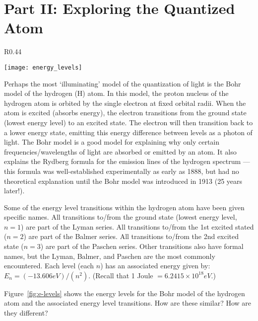 \section*{Part II: Exploring the Quantized Atom}
%
\begin{wrapfigure}{R}{0.44\textwidth}
  \vspace{-15pt}  
  \begin{center}
    \texttt{[image: energy\_levels]}
  \end{center}
  \vspace{-20pt}
  \caption{Energy level transitions for the Bohr Model of the hydrogen atom.}
  \label{fig:e-levels}
  \vspace{-10pt}
\end{wrapfigure}
%
Perhaps the most `illuminating' model of the quantization of light is the Bohr model of the hydrogen (H) atom. 
In this model, the proton nucleus of the hydrogen atom is orbited by the single electron at fixed orbital radii. 
When the atom is excited (absorbs energy), the electron transitions from the ground state (lowest energy level) to an excited state. 
The electron will then transition back to a lower energy state, emitting this energy difference between levels as a photon of light. 
The Bohr model is a good model for explaining why only certain frequencies/wavelengths of light are absorbed or emitted by an atom. 
It also explains the Rydberg formula for the emission lines of the hydrogen spectrum — this formula was well-established experimentally as early as 1888, but had no theoretical explanation until the Bohr model was introduced in 1913 (25 years later!). 
\par 
Some of the energy level transitions within the hydrogen atom have been given specific names. 
All transitions to/from the ground state (lowest energy level, $n = 1$) are part of the Lyman series. 
All transitions to/from the 1st excited stated ($n = 2$) are part of the Balmer series. 
All transitions to/from the 2nd excited state ($n = 3$) are part of the Paschen series. 
Other transitions also have formal names, but the Lyman, Balmer, and Paschen are the most commonly encountered. 
Each level (each $n$) has an associated energy given by: $E_{n}=(-13.606 eV)/(n^{2})$. 
(Recall that 1 Joule $= 6.2415 \times 10^{18} eV$.) 
\par 
Figure~\ref{fig:e-levels} shows the energy levels for the Bohr model of the hydrogen atom and the associated energy level transitions. 
How are these similar? 
How are they different? 
